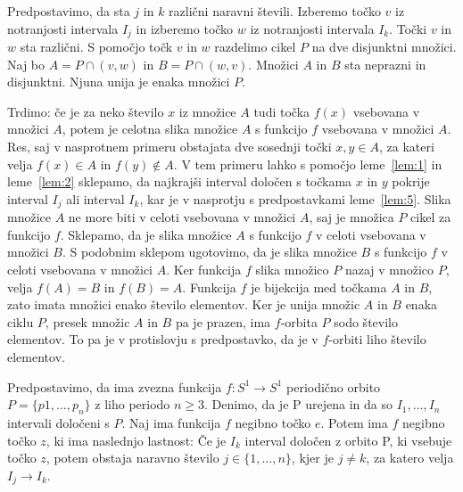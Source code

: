 \documentclass[../TG_magistrsko_delo_sections.tex]{subfiles}
\begin{document}
\begin{dokaz}
Predpostavimo, da sta $j$ in $k$ različni naravni števili. Izberemo točko $v$ iz notranjosti intervala $I_j$ in izberemo točko $w$ iz notranjosti intervala $I_k$. Točki $v$ in $w$ sta različni. S pomočjo točk $v$ in $w$ razdelimo cikel $P$ na dve disjunktni množici. Naj bo $A = P \cap (v, w)$ in $B = P \cap (w, v)$. Množici $A$ in $B$ sta neprazni in disjunktni. Njuna unija je enaka množici $P$.

Trdimo: če je za neko število $x$ iz množice $A$ tudi točka $f(x)$ vsebovana v množici $A$, potem je celotna slika množice $A$ s funkcijo $f$ vsebovana v množici $A$. Res, saj v nasprotnem primeru obstajata dve sosednji točki $x, y \in A$, za kateri velja $f(x) \in A$ in $f(y) \notin A$. V tem primeru lahko s pomočjo leme~\ref{lem:1} in leme~\ref{lem:2} sklepamo, da najkrajši interval določen s točkama $x$ in $y$ pokrije interval $I_j$ ali interval $I_k$, kar je v nasprotju s predpostavkami leme~\ref{lem:5}. Slika množice $A$ ne more biti v celoti vsebovana v množici $A$, saj je množica $P$ cikel za funkcijo $f$. Sklepamo, da je slika množice $A$ s funkcijo $f$ v celoti vsebovana v množici $B$. S podobnim sklepom ugotovimo, da je slika množice $B$ s funkcijo $f$ v celoti vsebovana v množici $A$. Ker funkcija $f$ slika množico $P$ nazaj v množico $P$, velja $f(A) = B$ in $f(B) = A$. Funkcija $f$ je bijekcija med točkama $A$ in $B$, zato imata množici enako število elementov. Ker je unija množic $A$ in $B$ enaka ciklu $P$, presek množic $A$ in $B$ pa je prazen, ima $f$-orbita $P$ sodo število elementov. To pa je v protislovju s predpostavko, da je v $f$-orbiti liho število elementov.
\end{dokaz}

\begin{lema}\label{lem:6}				%
Predpostavimo, da ima zvezna funkcija $f : S^1 \to S^1$ periodično orbito $P = \{p1, \dots, p_n\}$ z liho periodo $n \geq 3$. Denimo, da je P urejena in da so $I_1, \dots, I_n$ intervali določeni s $P$. Naj ima funkcija $f$ negibno točko $e$. Potem ima $f$ negibno točko $z$, ki ima naslednjo lastnost: Če je $I_k$ interval določen z orbito P, ki vsebuje točko $z$, potem obstaja naravno število $j \in \{1, \dots, n\}$, kjer je $j \neq k$, za katero velja $I_j \to I_k$.
\end{lema}
\end{document}
